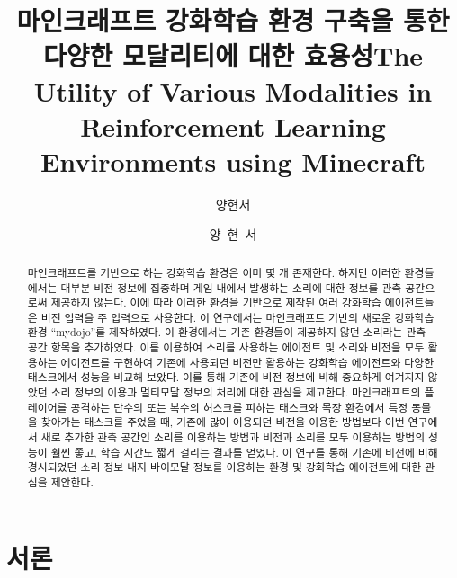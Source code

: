 \documentclass[oneside, under, ko]{snuthesis}
\title{마인크래프트 강화학습 환경 구축을 통한 다양한 모달리티에 대한 효용성}
\title*{The Utility of Various Modalities in Reinforcement Learning Environments using Minecraft}
\author{양현서}
\author*{양~현~서} %
\begin{document}
\makefrontcover

\cleardoublepage

\renewcommand{\abstractname}{국문초록}
\begin{abstract}
	마인크래프트를 기반으로 하는 강화학습 환경은 이미 몇 개 존재한다. 하지만 이러한 환경들에서는 대부분 비전 정보에 집중하며 게임 내에서 발생하는 소리에 대한 정보를 관측 공간으로써 제공하지 않는다. 이에 따라 이러한 환경을 기반으로 제작된 여러 강화학습 에이전트들은 비전 입력을 주 입력으로 사용한다. 이 연구에서는 마인크래프트 기반의 새로운 강화학습 환경 “mydojo”를 제작하였다. 이 환경에서는 기존 환경들이 제공하지 않던 소리라는 관측 공간 항목을 추가하였다. 이를 이용하여 소리를 사용하는 에이전트 및 소리와 비전을 모두 활용하는 에이전트를 구현하여 기존에 사용되던 비전만 활용하는 강화학습 에이전트와 다양한 태스크에서 성능을 비교해 보았다. 이를 통해 기존에 비전 정보에 비해 중요하게 여겨지지 않았던 소리 정보의 이용과 멀티모달 정보의 처리에 대한 관심을 제고한다. 마인크래프트의 플레이어를 공격하는 단수의 또는 복수의 허스크를 피하는 태스크와 목장 환경에서 특정 동물을 찾아가는 태스크를 주었을 때, 기존에 많이 이용되던 비전을 이용한 방법보다 이번 연구에서 새로 추가한 관측 공간인 소리를 이용하는 방법과 비전과 소리를 모두 이용하는 방법의 성능이 훨씬 좋고, 학습 시간도 짧게 걸리는 결과를 얻었다. 이 연구를 통해 기존에 비전에 비해 경시되었던 소리 정보 내지 바이모달 정보를 이용하는 환경 및 강화학습 에이전트에 대한 관심을 제안한다.
\end{abstract}

\tableofcontents

\cleardoublepage

\doublespacing
\renewcommand{\baselinestretch}{1.7}
\chapter{서론}
\end{document}
